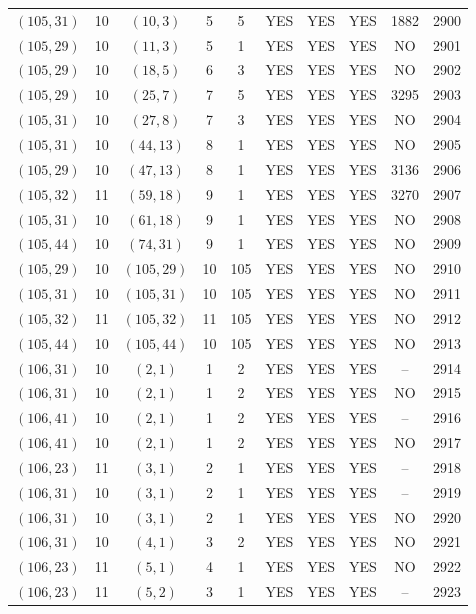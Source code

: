 \begin{longtable}{|c|c|c|c|c|c|c|c|c|c|}
$(105, 31)$ & 10 & $(10, 3)$ & 5 & 5 & YES & YES & YES & 1882 & 2900\\
$(105, 29)$ & 10 & $(11, 3)$ & 5 & 1 & YES & YES & YES & NO & 2901\\
$(105, 29)$ & 10 & $(18, 5)$ & 6 & 3 & YES & YES & YES & NO & 2902\\
$(105, 29)$ & 10 & $(25, 7)$ & 7 & 5 & YES & YES & YES & 3295 & 2903\\
$(105, 31)$ & 10 & $(27, 8)$ & 7 & 3 & YES & YES & YES & NO & 2904\\
$(105, 31)$ & 10 & $(44, 13)$ & 8 & 1 & YES & YES & YES & NO & 2905\\
$(105, 29)$ & 10 & $(47, 13)$ & 8 & 1 & YES & YES & YES & 3136 & 2906\\
$(105, 32)$ & 11 & $(59, 18)$ & 9 & 1 & YES & YES & YES & 3270 & 2907\\
$(105, 31)$ & 10 & $(61, 18)$ & 9 & 1 & YES & YES & YES & NO & 2908\\
$(105, 44)$ & 10 & $(74, 31)$ & 9 & 1 & YES & YES & YES & NO & 2909\\
$(105, 29)$ & 10 & $(105, 29)$ & 10 & 105 & YES & YES & YES & NO & 2910\\
$(105, 31)$ & 10 & $(105, 31)$ & 10 & 105 & YES & YES & YES & NO & 2911\\
$(105, 32)$ & 11 & $(105, 32)$ & 11 & 105 & YES & YES & YES & NO & 2912\\
$(105, 44)$ & 10 & $(105, 44)$ & 10 & 105 & YES & YES & YES & NO & 2913\\
$(106, 31)$ & 10 & $(2, 1)$ & 1 & 2 & YES & YES & YES & -- & 2914\\
$(106, 31)$ & 10 & $(2, 1)$ & 1 & 2 & YES & YES & YES & NO & 2915\\
$(106, 41)$ & 10 & $(2, 1)$ & 1 & 2 & YES & YES & YES & -- & 2916\\
$(106, 41)$ & 10 & $(2, 1)$ & 1 & 2 & YES & YES & YES & NO & 2917\\
$(106, 23)$ & 11 & $(3, 1)$ & 2 & 1 & YES & YES & YES & -- & 2918\\
$(106, 31)$ & 10 & $(3, 1)$ & 2 & 1 & YES & YES & YES & -- & 2919\\
$(106, 31)$ & 10 & $(3, 1)$ & 2 & 1 & YES & YES & YES & NO & 2920\\
$(106, 31)$ & 10 & $(4, 1)$ & 3 & 2 & YES & YES & YES & NO & 2921\\
$(106, 23)$ & 11 & $(5, 1)$ & 4 & 1 & YES & YES & YES & NO & 2922\\
$(106, 23)$ & 11 & $(5, 2)$ & 3 & 1 & YES & YES & YES & -- & 2923\\

\end{longtable}
